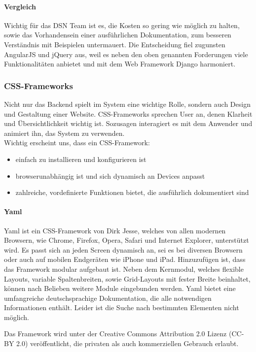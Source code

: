 \paragraph{Vergleich}
Wichtig für das DSN Team ist es, die Kosten so gering wie möglich zu halten, sowie das Vorhandensein einer ausführlichen Dokumentation, zum besseren Verständnis mit Beispielen untermauert. Die Entscheidung fiel zugunsten AngularJS und jQuery aus, weil es neben den oben genannten Forderungen viele Funktionalitäten anbietet und mit dem Web Framework Django harmoniert.

\subsubsection{CSS-Frameworks}
Nicht nur das Backend spielt im System eine wichtige Rolle, sondern auch Design und Gestaltung einer Website. CSS-Frameworks 
sprechen User an, denen Klarheit und Übersichtlichkeit wichtig ist. Sozusagen interagiert es mit dem Anwender und animiert ihn, das System zu verwenden. \\
Wichtig erscheint uns, dass ein CSS-Framework:
\begin{itemize}
\item einfach zu installieren und konfigurieren ist
\item browserunabhängig ist und sich dynamisch an Devices anpasst
\item zahlreiche, vordefinierte Funktionen bietet, die ausführlich dokumentiert sind
\end{itemize}

\newpage

\paragraph{Yaml}
Yaml ist ein CSS-Framework von Dirk Jesse, welches von allen modernen Browsern, wie Chrome, Firefox, Opera, Safari und Internet Explorer, unterstützt wird. Es passt sich an jeden Screen dynamisch an, sei es bei diversen Browsern oder auch auf mobilen Endgeräten wie iPhone und iPad. Hinzuzufügen ist, dass das Framework modular aufgebaut ist. Neben dem Kernmodul, welches flexible Layouts, variable Spaltenbreiten, sowie Grid-Layouts mit fester Breite beinhaltet, können nach Belieben weitere Module eingebunden werden. Yaml bietet eine umfangreiche deutschsprachige Dokumentation, die alle notwendigen Informationen enthält. Leider ist die Suche nach bestimmten Elementen nicht möglich. \cite{YAML}

Das Framework wird unter der Creative Commons Attribution 2.0 Lizenz (CC-BY 2.0) veröffentlicht, die privaten als auch kommerziellen Gebrauch erlaubt.

